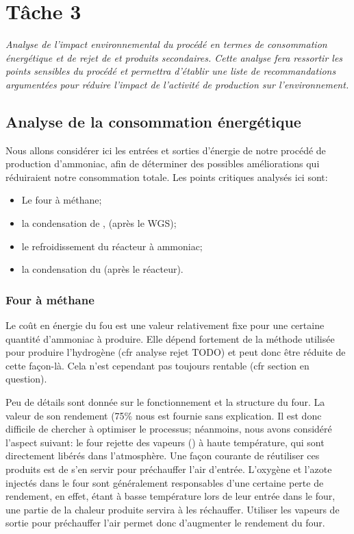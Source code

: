 \documentclass[10pt,a4paper]{report}
\begin{document}
\chapter{Tâche 3}
\textit{Analyse de l'impact environnemental du procédé en termes de consommation énergétique et de rejet de  et produits secondaires. Cette analyse fera ressortir les points sensibles du procédé et permettra d'établir une liste de recommandations argumentées pour réduire l'impact de l'activité de production sur l'environnement.}
\section{Analyse de la consommation énergétique}
Nous allons considérer ici les entrées et sorties d'énergie de notre procédé de production d'ammoniac, afin de déterminer des possibles améliorations qui réduiraient notre consommation totale. Les points critiques analysés ici sont:
\begin{itemize}
\item Le four à méthane;
\item la condensation de ,  (après le WGS);
\item le refroidissement du réacteur à ammoniac;
\item la condensation du  (après le réacteur).
\end{itemize}
\subsection{Four à méthane}
Le coût en énergie du fou est une valeur relativement fixe pour une certaine quantité d'ammoniac à produire. Elle dépend fortement de la méthode utilisée pour produire l'hydrogène (cfr analyse rejet TODO) et peut donc être réduite de cette façon-là. Cela n'est cependant pas toujours rentable (cfr section en question).

Peu de détails sont donnée sur le fonctionnement et la structure du four. La valeur de son rendement (\unit{75}{\%} nous est fournie sans explication. Il est donc difficile de chercher à optimiser le processus; néanmoins, nous avons considéré l'aspect suivant: le four rejette des vapeurs () à haute température, qui sont directement libérés dans l’atmosphère. Une façon courante de réutiliser ces produits est de s'en servir pour préchauffer l'air d'entrée. L'oxygène et l'azote injectés dans le four sont généralement responsables d'une certaine perte de rendement, en effet, étant à basse température lors de leur entrée dans le four, une partie de la chaleur produite servira à les réchauffer. Utiliser les vapeurs de sortie pour préchauffer l'air permet donc d'augmenter le rendement du four.
\end{document}
